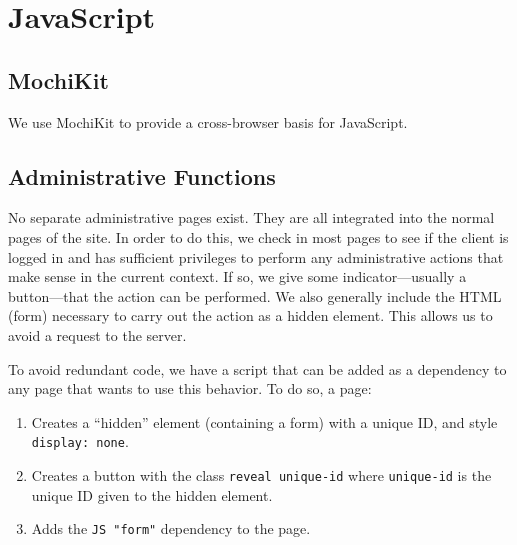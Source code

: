 \chapter{JavaScript}

\section{MochiKit}

We use MochiKit to provide a cross-browser basis for JavaScript.

\section{Administrative Functions}

No separate administrative pages exist. They are all integrated into the normal
pages of the site. In order to do this, we check in most pages to see if the
client is logged in and has sufficient privileges to perform any administrative
actions that make sense in the current context. If so, we give some
indicator---usually a button---that the action can be performed. We also
generally include the HTML (form) necessary to carry out the action as a hidden
element. This allows us to avoid a request to the server.

To avoid redundant code, we have a script that can be added as a dependency to
any page that wants to use this behavior. To do so, a page:

\begin{enumerate}

\item Creates a ``hidden'' element (containing a form) with a unique ID, and style
  \verb!display: none!.

\item Creates a button with the class \verb!reveal unique-id! where
  \verb!unique-id! is the unique ID given to the hidden element.

\item Adds the \verb!JS "form"! dependency to the page.

\end{enumerate}
